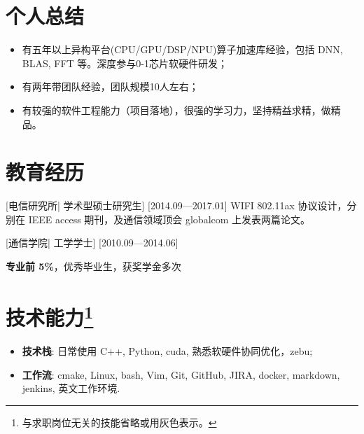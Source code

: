 \documentclass{resume}
\begin{document}


\ResumeTitle


\section{个人总结}

\begin{itemize}
  \item 有五年以上异构平台(CPU/GPU/DSP/NPU)算子加速库经验，包括 DNN, BLAS, FFT 等。深度参与0-1芯片软硬件研发；
  \item 有两年带团队经验，团队规模10人左右；
  \item 有较强的软件工程能力（项目落地），很强的学习力，坚持精益求精，做精品。
\end{itemize}

\section{教育经历}
[\textnormal{电信研究所|}  学术型硕士研究生]
[2014.09—2017.01]
WIFI 802.11ax 协议设计，分别在 IEEE access 期刊，及通信领域顶会 globalcom 上发表两篇论文。

\nocite{*} %
\printbibliography[heading={none}]



[\textnormal{通信学院|} 工学学士]
[2010.09—2014.06]

\textbf{专业前 5\%}，优秀毕业生，获奖学金多次

\section[技术能力]{技术能力\protect\footnote{与求职岗位无关的技能省略或用灰色表示。}}
\begin{itemize}
  \item \textbf{技术栈}: 日常使用 C++, Python, cuda, 熟悉软硬件协同优化，zebu;
  \item \textbf{工作流}: cmake, Linux, bash, Vim, Git, GitHub, JIRA, docker, markdown, jenkins, 英文工作环境.
\end{itemize}
\end{document}
